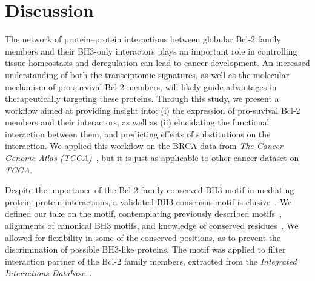 \documentclass[10pt,letterpaper]{article}
\begin{document}
\section*{Discussion}
The network of protein–protein interactions between globular Bcl-2 family members and their BH3-only interactors plays an important role in controlling tissue homeostasis and deregulation can lead to cancer development. An increased understanding of both the transciptomic signatures, as well as the molecular mechanism of pro-survival Bcl-2 members, will likely guide advantages in therapeutically targeting these proteins. Through this study, we present a workflow aimed at providing insight into: (i) the expression of pro-suvival Bcl-2 members and their interactors, as well as (ii) elucidating the functional interaction between them, and predicting effects of substitutions on the interaction. We applied this workflow on the BRCA data from \textit{The Cancer Genome Atlas (TCGA)}~\cite{Chang2013}, but it is just as applicable to other cancer dataset on \textit{TCGA}.

Despite the importance of the Bcl-2 family conserved BH3 motif in mediating protein–protein interactions, a validated BH3 consensus motif is elusive~\cite{Aouacheria2013}. We defined our take on the motif, contemplating previously described motifs~\cite{Day2008, Hawley2012}, alignments of canonical BH3 motifs, and knowledge of conserved residues~\cite{Sattler2010}. We allowed for flexibility in some of the conserved positions, as to prevent the discrimination of possible BH3-like proteins. The motif was applied to filter interaction partner of the Bcl-2 family members, extracted from the \textit{Integrated Interactions Database}~\cite{Kotlyar2016}.
\end{document}
